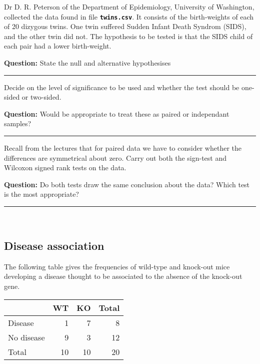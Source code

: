 \documentclass[]{article}
\begin{document}
Dr D. R. Peterson of the Department of Epidemiology, University of
Washington, collected the data found in file
\textbf{\texttt{twins.csv}}. It consists of the birth-weights of each of
20 dizygous twins. One twin suffered Sudden Infant Death Syndrom (SIDS),
and the other twin did not. The hypothesis to be tested is that the SIDS
child of each pair had a lower birth-weight.

{\textbf{Question:}} State the null and alternative hypothesises

\begin{center}\rule{0.5\linewidth}{\linethickness}\end{center}

Decide on the level of significance to be used and whether the test
should be one-sided or two-sided.

{\textbf{Question:}} Would be appropriate to treat these as paired or
independant samples?

\begin{center}\rule{0.5\linewidth}{\linethickness}\end{center}

Recall from the lectures that for paired data we have to consider
whether the differences are symmetrical about zero. Carry out both the
sign-test and Wilcoxon signed rank tests on the data.

{\textbf{Question:}} Do both tests draw the same conclusion about the
data? Which test is the most appropriate?

\begin{center}\rule{0.5\linewidth}{\linethickness}\end{center}

~

\hypertarget{disease-association}{%
\subsection{Disease association}\label{disease-association}}

The following table gives the frequencies of wild-type and knock-out
mice developing a disease thought to be associated to the absence of the
knock-out gene.

\begin{longtable}[]{@{}lrrr@{}}
\toprule
~ & WT & KO & Total\tabularnewline
\midrule
\endhead
Disease & 1 & 7 & 8\tabularnewline
No disease & 9 & 3 & 12\tabularnewline
Total & 10 & 10 & 20\tabularnewline
\bottomrule
\end{longtable}
\end{document}
